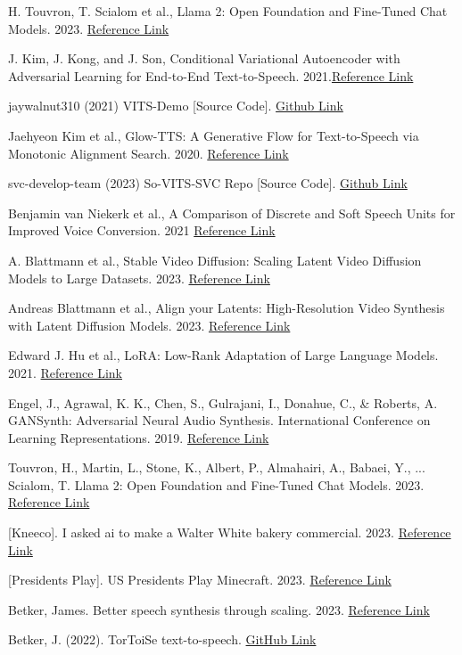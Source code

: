 \documentclass[conference]{IEEEtran}
\begin{document}
\begin{thebibliography}{00}
 H. Touvron, T. Scialom et al., Llama 2: Open Foundation and Fine-Tuned Chat Models. 2023. \href{https://arxiv.org/pdf/2307.09288.pdf}{Reference Link}

 J. Kim, J. Kong, and J. Son, Conditional Variational Autoencoder with Adversarial Learning for End-to-End Text-to-Speech. 2021.\href{https://arxiv.org/pdf/2106.06103.pdf}{Reference Link}

 jaywalnut310 (2021) VITS-Demo [Source Code]. \href{https://jaywalnut310.github.io/vits-demo/index.html}{Github Link}

  Jaehyeon Kim et al., Glow-TTS: A Generative Flow for Text-to-Speech via Monotonic Alignment Search. 2020. \href{https://arxiv.org/pdf/2005.11129.pdf}{Reference Link}

 svc-develop-team (2023) So-VITS-SVC Repo [Source Code]. \href{https://github.com/svc-develop-team/so-vits-svc}{Github Link}

 Benjamin van Niekerk et al., A Comparison of Discrete and Soft Speech Units for Improved Voice Conversion. 2021 \href{https://arxiv.org/abs/2111.02392}{Reference Link}

 A. Blattmann et al., Stable Video Diffusion: Scaling Latent Video Diffusion Models to Large Datasets. 2023. \href{https://arxiv.org/abs/2311.15127}{Reference Link}

 Andreas Blattmann et al., Align your Latents: High-Resolution Video Synthesis with Latent Diffusion Models. 2023. \href{https://arxiv.org/pdf/2304.08818.pdf}{Reference Link}

 Edward J. Hu et al., LoRA: Low-Rank Adaptation of Large Language Models. 2021. \href{https://arxiv.org/pdf/2106.09685.pdf}{Reference Link}

 Engel, J., Agrawal, K. K., Chen, S., Gulrajani, I., Donahue, C., \& Roberts, A. GANSynth: Adversarial Neural Audio Synthesis. International Conference on Learning Representations. 2019. \href{https://openreview.net/forum?id=H1xQVn09FX}{Reference Link}

 Touvron, H., Martin, L., Stone, K., Albert, P., Almahairi, A., Babaei, Y., ... Scialom, T. Llama 2: Open Foundation and Fine-Tuned Chat Models. 2023. \href{http://arxiv.org/abs/2307.09288}{Reference Link}

 [Kneeco]. I asked ai to make a Walter White bakery commercial. 2023. \href{https://www.youtube.com/watch?v=dgkZTHHom94}{Reference Link}

 [Presidents Play]. US Presidents Play Minecraft. 2023. \href{https://www.youtube.com/watch?v=qYF0jhwrzxA}{Reference Link}

 Betker, James. Better speech synthesis through scaling. 2023. \href{https://arxiv.org/pdf/2305.07243.pdf}{Reference Link}

 Betker, J. (2022). TorToiSe text-to-speech. \href{https://github.com/neonbjb/tortoise-tts/blob/main/tortoise/api_fast.py}{GitHub Link}

\end{thebibliography}
\end{document}
